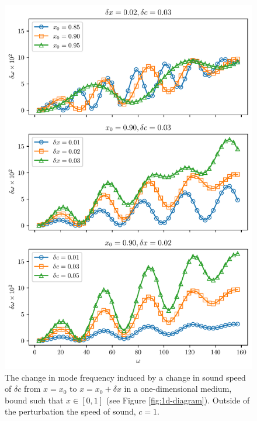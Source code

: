 \begin{figure}
    \centering
    \includegraphics{figures/glitch-1d-example-results.pdf}
    \caption{The change in mode frequency induced by a change in sound speed of \(\delta c\) from \(x=x_0\) to \(x=x_0 + \delta x\) in a one-dimensional medium, bound such that \(x \in [0, 1]\) (see Figure \ref{fig:1d-diagram}). Outside of the perturbation the speed of sound, \(c=1\).
    }
    \label{fig:1d-results}
\end{figure}


